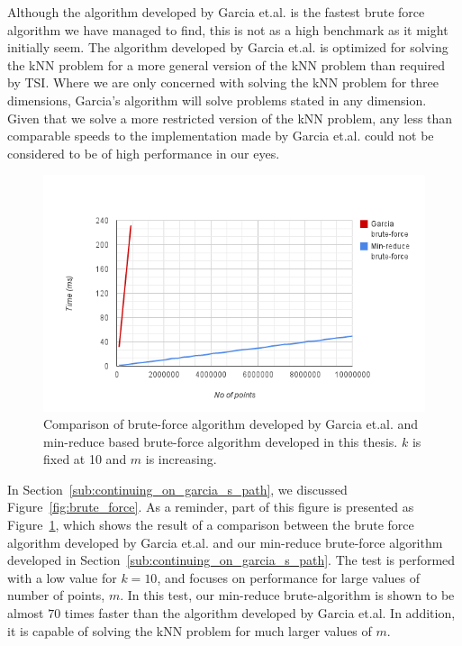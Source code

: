 Although the algorithm developed by Garcia et.al. is the fastest brute force algorithm we have managed to find, this is not as a high benchmark as it might initially seem. The algorithm developed by Garcia et.al. is optimized for solving the kNN problem for a more general version of the kNN problem than required by TSI. Where we are only concerned with solving the kNN problem for three dimensions, Garcia's algorithm will solve problems stated in any dimension. Given that we solve a more restricted version of the kNN problem, any less than comparable speeds to the implementation made by Garcia et.al. could not be considered to be of high performance in our eyes.

\begin{figure}[ht!]
    \centering
    \includegraphics[width=120mm]{../gfx/fin-garcia-vs-min-reduce.png}
    \caption{Comparison of brute-force algorithm developed by Garcia et.al. and min-reduce based brute-force algorithm developed in this thesis. $k$ is fixed at 10 and $m$ is increasing.}
    \label{fig:fin-garcia-vs-min-reduce}
\end{figure}

In Section~\ref{sub:continuing_on_garcia_s_path}, we discussed Figure~\ref{fig:brute_force}. As a reminder, part of this figure is presented as Figure~\ref{fig:fin-garcia-vs-min-reduce}, which shows the result of a comparison between the brute force algorithm developed by Garcia et.al. and our min-reduce brute-force algorithm developed in Section~\ref{sub:continuing_on_garcia_s_path}. The test is performed with a low value for $k=10$, and focuses on performance for large values of number of points, $m$. In this test, our min-reduce brute-algorithm is shown to be almost $70$ times faster than the algorithm developed by Garcia et.al. In addition, it is capable of solving the kNN problem for much larger values of $m$.

